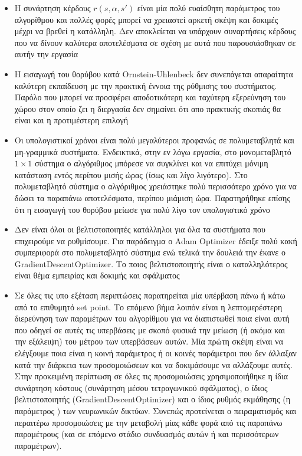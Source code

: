 \documentclass[11pt]{article} %
\numberwithin{equation}{subsection}
\begin{document}
\begin{itemize}
\item Η συνάρτηση κέρδους $r(s, \alpha, s')$ είναι μία πολύ ευαίσθητη παράμετρος του αλγορίθμου και πολλές φορές μπορεί να χρειαστεί αρκετή σκέψη και δοκιμές μέχρι να βρεθεί η κατάλληλη. Δεν αποκλείεται να υπάρχουν συναρτήσεις κέρδους που να δίνουν καλύτερα αποτελέσματα σε σχέση με αυτά που παρουσιάσθηκαν σε αυτήν την εργασία\\
\item Η εισαγωγή του θορύβου κατά Ornstein-Uhlenbeck δεν συνεπάγεται απαραίτητα καλύτερη εκπαίδευση με την πρακτική έννοια της ρύθμισης του συστήματος. Παρόλο που μπορεί να προσφέρει αποδοτικότερη και ταχύτερη εξερεύνηση του χώρου στον οποίο ζει η διεργασία δεν σημαίνει ότι απο πρακτικής σκοπιάς θα είναι και η προτιμέστερη επιλογή\\
\item Οι υπολογιστικοί χρόνοι είναι πολύ μεγαλύτεροι προφανώς σε πολυμεταβλητά και μη-γραμμικά συστήματα. Ενδεικτικά, στην εν λόγω εργασία, στο μονομεταβλητό $1 \times 1$ σύστημα ο αλγόριθμος μπόρεσε να συγκλίνει και να επιτύχει μόνιμη κατάσταση εντός περίπου μισής ώρας (ίσως και λίγο λιγότερο). Στο πολυμεταβλητό σύστημα ο αλγόριθμος χρειάστηκε πολύ περισσότερο χρόνο για να δώσει τα παραπάνω αποτελέσματα, περίπου μιάμιση ώρα. Παρατηρήθηκε επίσης ότι η εισαγωγή του θορύβου μείωσε για πολύ λίγο τον υπολογιστικό χρόνο\\
\item Δεν είναι όλοι οι βελτιστοποιητές κατάλληλοι για όλα τα συστήματα που επιχειρούμε να ρυθμίσουμε. Για παράδειγμα ο Adam Optimizer έδειξε πολύ κακή συμπεριφορά στο πολυμεταβλητό σύστημα ενώ τελικά την δουλειά την έκανε ο GradientDescentOptimizer. Το ποιος βελτιστοποιητής είναι ο καταλληλότερος είναι θέμα εμπειρίας και δοκιμής και σφάλματος  
\item Σε όλες τις υπο εξέταση περιπτώσεις παρατηρείται μία υπέρβαση πάνω ή κάτω από το επιθυμητό set point. Το επόμενο βήμα λοιπόν είναι η λεπτομερέστερη διερεύνηση των παραμέτρων του αλγορίθμου για να διαπιστωθεί ποια είναι αυτή που οδηγεί σε αυτές τις υπερβάσεις με σκοπό φυσικά την μείωση (ή ακόμα και την εξάλειψη) του μέτρου των υπερβάσεων αυτών. Μία πρώτη σκέψη είναι να ελέγξουμε ποια είναι η κοινή παράμετρος ή οι κοινές παράμετροι που δεν άλλαξαν κατά την διάρκεια των προσομοιώσεων και να δοκιμάσουμε να αλλάξουμε αυτές. Στην προκειμένη περίπτωση σε όλες τις προσομοιώσεις χρησιμοποιήθηκε η ίδια συνάρτηση κόστους (συνάρτηση μέσου τετραγωνικού σφάλματος), ο ίδιος βελτιστοποιητής (GradientDescentOptimizer) και ο ίδιος ρυθμός εκμάθησης (η παράμετρος \tau) των νευρωνικών δικτύων. Συνεπώς προτείνεται ο πειραματισμός και περαιτέρω προσομοιώσεις με την μεταβολή μίας κάθε φορά από τις παραπάνω παραμέτρους (και σε επόμενο στάδιο συνδυασμός αυτών ή και περισσότερων παραμέτρων).
\end{itemize}
\end{document}
